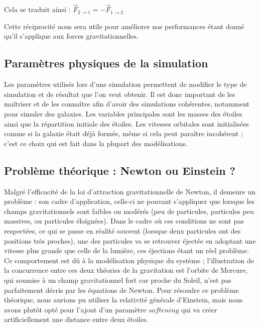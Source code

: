 \vspace{2mm}

Cela se traduit ainsi :
$\vec{F}_{2 \rightarrow 1} = -\vec{F}_{1 \rightarrow 2}  $

\vspace{2mm}
Cette réciprocité nous sera utile pour améliorer nos performances étant donné qu'il s'applique aux forces gravitationnelles.


\vspace{3mm}
\subsection{Paramètres physiques de la simulation}
\vspace{2mm}

Les paramètres utilisés lors d'une simulation permettent de modifier le type de simulation et de résultat que l'on veut obtenir. Il est donc important de les maîtriser et de les connaître afin d'avoir des simulations cohérentes, notamment pour simuler des galaxies. Les variables principales sont les masses des étoiles ainsi que la répartition initiale des étoiles. Les vitesses orbitales sont initialisées comme si la galaxie était déjà formée, même si cela peut paraître incohérent ; c'est ce choix qui est fait dans la plupart des modélisations.

\vspace{3mm}
\subsection{Problème théorique : Newton ou Einstein ?}
\vspace{2mm}

Malgré l'efficacité de la loi d'attraction gravitationnelle de Newton, il demeure un problème : son cadre d'application, celle-ci ne pouvant s'appliquer que lorsque les champs gravitationnels sont faibles ou modérés (peu de particules, particules peu massives, ou particules éloignées). Dans le cadre où ces conditions ne sont pas respectées, ce qui se passe en réalité souvent (lorsque deux particules ont des positions très proches), une des particules va se retrouver éjectée en adoptant une vitesse plus grande que celle de la lumière, ces éjections étant un réel problème. Ce comportement est dû à la modélisation physique  du système ; l'illustration de la concurrence entre ces deux théories de la gravitation est l'orbite de Mercure, qui soumise à un champ gravitationnel fort car proche du Soleil, n'est pas parfaitement décris par les équations de Newton. Pour résoudre ce problème théorique, nous aurions pu utiliser la relativité générale d'Einstein, mais nous avons plutôt opté pour l'ajout d'un paramètre $softening$ qui va créer artificiellement une distance entre deux étoiles.

